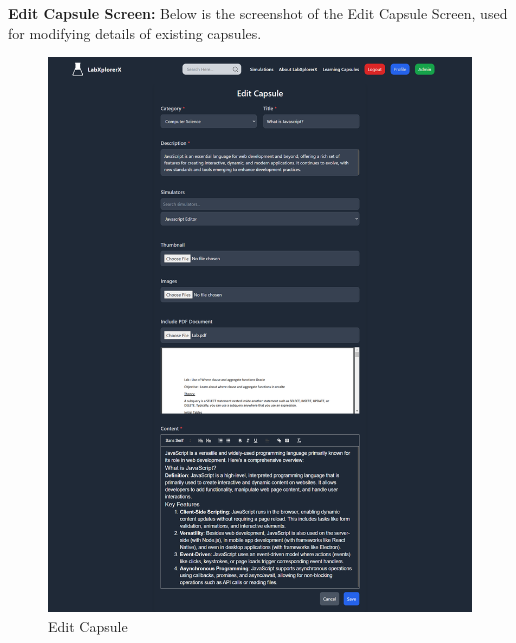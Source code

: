 \textbf{Edit Capsule Screen:} Below is the screenshot of the Edit Capsule Screen, used for modifying details of existing capsules.
\begin{figure}[H]
    \centering
    \includegraphics[width = 16cm]{Diagrams/output/edit_capsule.png}
    \caption{Edit Capsule}
\end{figure}

